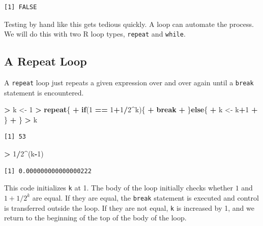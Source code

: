 \documentclass[]{krantz}
\makeatletter
\newenvironment{Shaded}{\begin{snugshade}}{\end{snugshade}}
\newcommand{\DecValTok}[1]{\textcolor[rgb]{0.06,0.06,0.06}{#1}}
\newcommand{\StringTok}[1]{\textcolor[rgb]{0.5,0.5,0.5}{#1}}
\newcommand{\ControlFlowTok}[1]{\textcolor[rgb]{0.27,0.27,0.27}{\textbf{#1}}}
\newcommand{\OperatorTok}[1]{\textcolor[rgb]{0.43,0.43,0.43}{\textbf{#1}}}
\newcommand{\NormalTok}[1]{#1}
\newenvironment{kframe}{%
\medskip{}
\setlength{\fboxsep}{.8em}
 \def\at@end@of@kframe{}%
 \ifinner\ifhmode%
  \def\at@end@of@kframe{\end{minipage}}%
  \begin{minipage}{\columnwidth}%
 \fi\fi%
 \def\FrameCommand##1{\hskip\@totalleftmargin \hskip-\fboxsep
 \colorbox{shadecolor}{##1}\hskip-\fboxsep
     \hskip-\linewidth \hskip-\@totalleftmargin \hskip\columnwidth}%
 \MakeFramed {\advance\hsize-\width
   \@totalleftmargin\z@ \linewidth\hsize
   \@setminipage}}%
 {\par\unskip\endMakeFramed%
 \at@end@of@kframe}
\renewenvironment{Shaded}{\begin{kframe}}{\end{kframe}}
\makeatother
\begin{document}
\begin{verbatim}
[1] FALSE
\end{verbatim}

Testing by hand like this gets tedious quickly. A loop can automate the
process. We will do this with two R loop types, \texttt{repeat} and
\texttt{while}.

\subsection{A Repeat Loop}\label{a-repeat-loop}

A \texttt{repeat} loop just repeats a given expression over and over
again until a \texttt{break} statement is encountered.

\begin{Shaded}
\begin{Highlighting}[]
\OperatorTok{>}\StringTok{ }\NormalTok{k <-}\StringTok{ }\DecValTok{1}
\OperatorTok{>}\StringTok{ }\ControlFlowTok{repeat}\NormalTok{\{}
\OperatorTok{+}\StringTok{     }\ControlFlowTok{if}\NormalTok{(}\DecValTok{1} \OperatorTok{==}\StringTok{ }\DecValTok{1}\OperatorTok{+}\DecValTok{1}\OperatorTok{/}\DecValTok{2}\OperatorTok{^}\NormalTok{k)\{}
\OperatorTok{+}\StringTok{         }\ControlFlowTok{break}
\OperatorTok{+}\StringTok{     }\NormalTok{\}}\ControlFlowTok{else}\NormalTok{\{}
\OperatorTok{+}\StringTok{         }\NormalTok{k <-}\StringTok{ }\NormalTok{k}\OperatorTok{+}\DecValTok{1}
\OperatorTok{+}\StringTok{     }\NormalTok{\}}
\OperatorTok{+}\StringTok{ }\NormalTok{\}}
\OperatorTok{>}\StringTok{ }\NormalTok{k}
\end{Highlighting}
\end{Shaded}

\begin{verbatim}
[1] 53
\end{verbatim}

\begin{Shaded}
\begin{Highlighting}[]
\OperatorTok{>}\StringTok{ }\DecValTok{1}\OperatorTok{/}\DecValTok{2}\OperatorTok{^}\NormalTok{(k}\OperatorTok{-}\DecValTok{1}\NormalTok{)}
\end{Highlighting}
\end{Shaded}

\begin{verbatim}
[1] 0.000000000000000222
\end{verbatim}

This code initializes \texttt{k} at 1. The body of the loop initially
checks whether \(1\) and \(1+1/2^k\) are equal. If they are equal, the
\texttt{break} statement is executed and control is transferred outside
the loop. If they are not equal, \texttt{k} is increased by 1, and we
return to the beginning of the top of the body of the loop.
\end{document}

